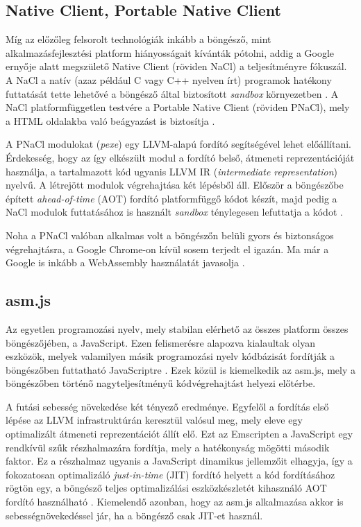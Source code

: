 \subsection{Native Client, Portable Native Client}

Míg az előzőleg felsorolt technológiák inkább a böngésző, mint alkalmazásfejlesztési platform hiányosságait kívánták pótolni, addig a Google ernyője alatt megszülető Native Client (röviden NaCl) a teljesítményre fókuszál. A NaCl a natív (azaz például C vagy C++ nyelven írt) programok hatékony futtatását tette lehetővé a böngésző által biztosított \textit{sandbox} környezetben \cite{Yee::NativeClient}. A NaCl platformfüggetlen testvére a Portable Native Client (röviden PNaCl), mely a HTML oldalakba való beágyazást is biztosítja \cite{NativeClient::NaClAndPNaCl}.

A PNaCl modulokat (\textit{pexe}) egy LLVM-alapú fordító segítségével lehet előállítani. Érdekesség, hogy az így elkészült modul a fordító belső, átmeneti reprezentációját használja, a tartalmazott kód ugyanis LLVM IR (\textit{intermediate representation}) nyelvű. A létrejött modulok végrehajtása két lépésből áll. Először a böngészőbe épített \textit{ahead-of-time} (AOT) fordító platformfüggő kódot készít, majd pedig a NaCl modulok futtatásához is használt \textit{sandbox} ténylegesen lefuttatja a kódot \cite{NativeClient::TechnicalOverview}.

Noha a PNaCl valóban alkalmas volt a böngészőn belüli gyors és biztonságos végrehajtásra, a Google Chrome-on kívül sosem terjedt el igazán. Ma már a Google is inkább a WebAssembly használatát javasolja \cite{Nelson::GoodbyePNaClHelloWebAssembly}.

\subsection{asm.js}

Az egyetlen programozási nyelv, mely stabilan elérhető az összes platform összes böngészőjében, a JavaScript. Ezen felismerésre alapozva kialaultak olyan eszközök, melyek valamilyen másik programozási nyelv kódbázisát fordítják a böngészőben futtatható \mbox{JavaScriptre} \cite{ListOfLanguagesThatCompileToJS}. Ezek közül is kiemelkedik az asm.js, mely a böngészőben történő nagyteljesítményű kódvégrehajtást helyezi előtérbe.

A futási sebesség növekedése két tényező eredménye. Egyfelől a fordítás első lépése az LLVM infrastruktúrán keresztül valósul meg, mely eleve egy optimalizált átmeneti reprezentációt állít elő. Ezt az Emscripten a JavaScript egy rendkívül szűk részhalmazára fordítja, mely a hatékonyság mögötti második faktor. Ez a részhalmaz ugyanis a \mbox{JavaScript} dinamikus jellemzőit elhagyja, így a fokozatosan optimalizáló \textit{just-in-time} (JIT) fordító helyett a kód fordításához rögtön egy, a böngésző teljes optimalizálási eszközkészletét kihasználó AOT fordító használható \cite{Zakai::BigWebAppCompileIt}. Kiemelendő azonban, hogy az asm.js alkalmazása akkor is sebességnövekedéssel jár, ha a böngésző csak JIT-et használ.

